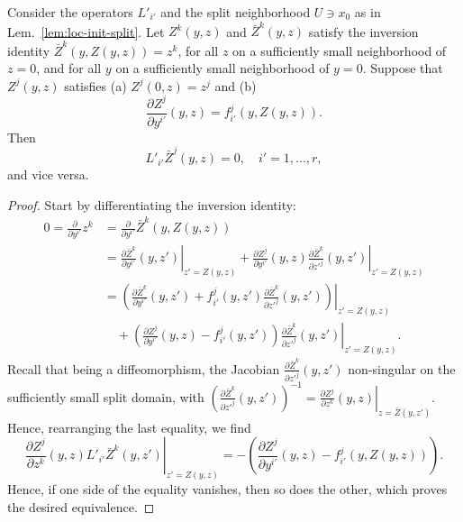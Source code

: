 \begin{lemma} \label{lem:eq-loc-inv}
Consider the operators $L'_{i'}$ and the split neighborhood $U\ni x_0$ as in
Lem.~\ref{lem:loc-init-split}. Let $Z^k(y,z)$ and $\bar{Z}^k(y,z)$ satisfy the
inversion identity $\bar{Z}^k(y, Z(y, z)) = z^k$, for all $z$ on a sufficiently
small neighborhood of $z=0$, and for all $y$ on a sufficiently small
neighborhood of $y=0$. Suppose that $Z^j(y,z)$ satisfies (a) $Z^j(0,z) = z^j$
and (b)
\begin{equation} \label{eq:parallel-Z}
  \frac{\partial Z^j}{\partial y^{i'}}(y,z) = f_{i'}^j(y, Z(y,z)) .
\end{equation}
Then
\begin{equation} \label{eq:lie-const-Z}
  L'_{i'} \bar{Z}^j(y,z) = 0, \quad i'=1,\ldots,r ,
\end{equation}
and vice versa.
\end{lemma}
\begin{proof}
Start by differentiating the inversion identity:
\begin{align*}
  0 = \frac{\partial}{\partial y^{i'}} z^k
  &= \frac{\partial}{\partial y^{i'}} \bar{Z}^k(y, Z(y, z))
  \\
  &= \left. \frac{\partial \bar{Z}^k}{\partial y^{i'}}(y, z') \right|_{z'=Z(y,z)}
    + \frac{\partial Z^j}{\partial y^{i'}}(y,z)
      \left. \frac{\partial \bar{Z}^k}{\partial z'^j}(y,z') \right|_{z'=Z(y,z)}
  \\
  &= \left. \left(\frac{\partial \bar{Z}^k}{\partial y^{i'}}(y, z')
      + f_{i'}^j(y,z') \frac{\partial \bar{Z}^k}{\partial z'^j}(y,z')\right) \right|_{z'=Z(y,z)}
    \\ &\quad {}
    + \left. \left(\frac{\partial Z^j}{\partial y^{i'}}(y,z) - f_{i'}^j(y,z')\right)
      \frac{\partial \bar{Z}^k}{\partial z'^j}(y,z') \right|_{z'=Z(y,z)}
    .
\end{align*}
Recall that being a diffeomorphism, the Jacobian $\frac{\partial
\bar{Z}^k}{\partial z'^j}(y,z')$ non-singular on the sufficiently small split
domain, with $(\frac{\partial
\bar{Z}^k}{\partial z'^j}(y,z'))^{-1} = \left. \frac{\partial Z^j}{\partial z^k}(y,z) \right|_{z=\bar{Z}(y,z')}$. Hence, rearranging the last equality, we find
\[
  \left. \frac{\partial Z^j}{\partial z^k}(y,z)
    L'_{i'} \bar{Z}^k(y,z') \right|_{z'=Z(y,z)}
  = -\left(\frac{\partial Z^j}{\partial y^{i'}}(y,z) - f_{i'}^j(y,Z(y,z))\right) .
\]
Hence, if one side of the equality vanishes, then so does the other, which
proves the desired equivalence.
\end{proof}

